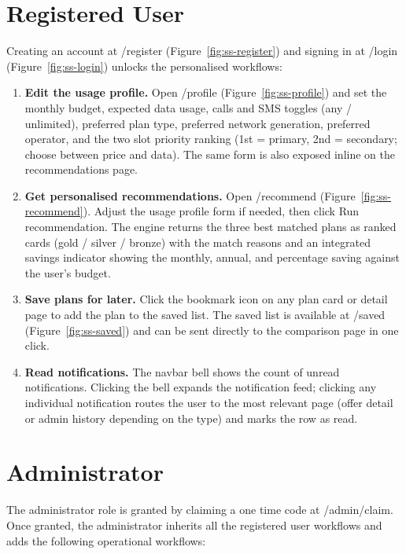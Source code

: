 \section{Registered User}

Creating an account at /register (Figure~\ref{fig:ss-register}) and signing in at /login (Figure~\ref{fig:ss-login}) unlocks the personalised workflows:

\begin{enumerate}
  \item \textbf{Edit the usage profile.} Open /profile (Figure~\ref{fig:ss-profile}) and set the monthly budget, expected data usage, calls and SMS toggles (any / unlimited), preferred plan type, preferred network generation, preferred operator, and the two slot priority ranking (1st = primary, 2nd = secondary; choose between price and data). The same form is also exposed inline on the recommendations page.
  \item \textbf{Get personalised recommendations.} Open /recommend (Figure~\ref{fig:ss-recommend}). Adjust the usage profile form if needed, then click \guillemotleft{}Run recommendation\guillemotright{}. The engine returns the three best matched plans as ranked cards (gold / silver / bronze) with the match reasons and an integrated savings indicator showing the monthly, annual, and percentage saving against the user's budget.
  \item \textbf{Save plans for later.} Click the bookmark icon on any plan card or detail page to add the plan to the saved list. The saved list is available at /saved (Figure~\ref{fig:ss-saved}) and can be sent directly to the comparison page in one click.
  \item \textbf{Read notifications.} The navbar bell shows the count of unread notifications. Clicking the bell expands the notification feed; clicking any individual notification routes the user to the most relevant page (offer detail or admin history depending on the type) and marks the row as read.
\end{enumerate}

\section{Administrator}

The administrator role is granted by claiming a one time code at /admin/claim. Once granted, the administrator inherits all the registered user workflows and adds the following operational workflows:


